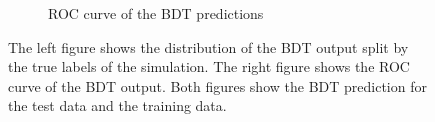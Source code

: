 \begin{figure}
\begin{subfigure}{0.5\textwidth}
        \caption{ROC curve of the BDT predictions}
        \label{fig:SS_ROC}
    \end{subfigure}%
    \caption{The left figure shows the distribution of the BDT output split by the true labels of the simulation. The right figure shows the ROC curve of the BDT output. Both figures show the BDT prediction for the test data and the training data.}
    \label{fig:SS_eval}
\end{figure}

